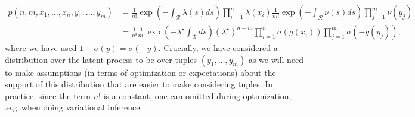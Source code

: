 \documentclass{article}
\newcommand{\calR}{\mathcal{R}}
\newcommand{\ls}{\lambda(s)}
\newcommand{\ns}{\nu(s)}
\newcommand{\sigmoid}{\sigma}
\begin{document}
	 \begin{align}
	 p(n, m, x_1, \ldots, x_n, y_1, \ldots, y_m) &= 	\frac{1}{n!} \exp\left(-\int_{\calR} \ls ds\right) \prod_{i=1}^{n}  {\lambda(x_i)} 	\frac{1}{m!} \exp\left(-\int_{\calR} \ns ds\right) \prod_{j=1}^{m}  {\nu(y_j)}  \\
	 &= \frac{1}{n!} \frac{1}{m!}  \exp \left(- \lambda^{\star} \int_{\calR} ds \right) (\lambda^{\star})^{n+m} \prod_{i=1}^{n}  \sigma(g(x_i)) \prod_{j=1}^{m} \sigma(- g(y_j)) ,
	 \end{align}
	  where we have used $1 - \sigmoid(y) = \sigmoid(-y)$. Crucially, we have considered a distribution over the latent process to be over tuples $(y_1, \ldots, y_m)$ as we will need to make assumptions (in terms of optimization or expectations) about the support of this distribution that are easier to make considering tuples. In practice, since the term $n!$ is a constant, one can omitted during optimization, .e.g~when doing variational inference. 
\end{document}
